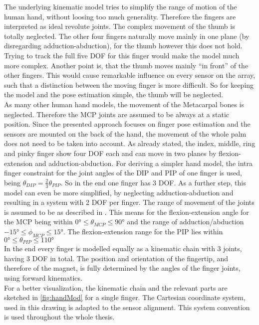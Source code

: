 The underlying kinematic model tries to simplify the range of motion of the human hand, without loosing too much generality. Therefore the fingers are interpreted as ideal revolute joints. The complex movement of the thumb is totally neglected. The other four fingers naturally move mainly in one plane (by disregarding adduction-abduction), for the thumb however this does not hold. Trying to track the full five \ac{DOF} for this finger would make the model much more complex. Another point is, that the thumb moves mainly ``in front'' of the other fingers. This would cause remarkable influence on every sensor on the array, such that a distinction between the moving finger is more difficult. So for keeping the model and the pose estimation simple, the thumb will be neglected.\\
As many other human hand models, the movement of the Metacarpal bones is neglected. Therefore the \ac{MCP} joints are assumed to be always at a static position. Since the presented approach focuses on finger pose estimation and the sensors are mounted on the back of the hand, the movement of the whole palm does not need to be taken into account. As already stated, the index, middle, ring and pinky finger show four \ac{DOF} each and can move in two planes by flexion-extension and adduction-abduction. For deriving a simpler hand model, the intra finger constraint for the joint angles of the \ac{DIP} and \ac{PIP} of one finger is used, being $ \theta_{DIP} = \frac{2}{3} \theta_{PIP} $. So in the end one finger has 3 \ac{DOF}. As a further step, this model can even be more simplified, by neglecting adduction-abduction and resulting in a system with 2 \ac{DOF} per finger. The range of movement of the joints is assumed to be as described in \cite{lin2000modeling}. This means for the flexion-extension angle for the \ac{MCP} being within $ \ang{0} \leq \theta_{MCP} \leq \ang{90} $ and the range of adduction/abduction $ \ang{-15} \leq \phi_{MCP} \leq \ang{+15} $. The flexion-extension range for the \ac{PIP} lies within $ \ang{0} \leq \theta_{PIP} \leq \ang{110} $\\
In the end every finger is modelled equally as a kinematic chain with 3 joints, having 3 \ac{DOF} in total. The position and orientation of the fingertip, and therefore of the magnet, is fully determined by the angles of the finger joints, using forward kinematics.\\
For a better visualization, the kinematic chain and the relevant parts are sketched in \ref{fig:handMod} for a single finger. The Cartesian coordinate system, used in this drawing is adapted to the sensor alignment. This system convention is used throughout the whole thesis.
